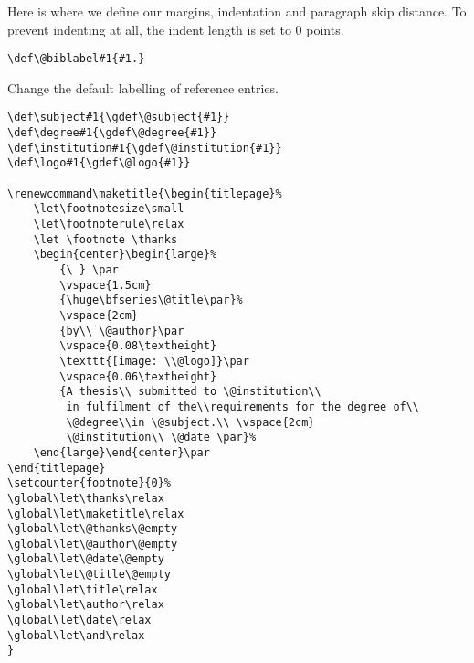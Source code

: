 \normalsize\doublespacing
Here is where we define our margins, indentation and paragraph skip distance.  To prevent indenting at all, the indent length is set to 0 points.

\small\singlespacing
\begin{verbatim}
\def\@biblabel#1{#1.}
\end{verbatim}

\normalsize\doublespacing
Change the default labelling of reference entries.

\small\singlespacing
\begin{verbatim}
\def\subject#1{\gdef\@subject{#1}}
\def\degree#1{\gdef\@degree{#1}}
\def\institution#1{\gdef\@institution{#1}}
\def\logo#1{\gdef\@logo{#1}}

\renewcommand\maketitle{\begin{titlepage}%
	\let\footnotesize\small
	\let\footnoterule\relax
	\let \footnote \thanks
	\begin{center}\begin{large}%
		{\ } \par
		\vspace{1.5cm}
		{\huge\bfseries\@title\par}%
		\vspace{2cm}
		{by\\ \@author}\par
		\vspace{0.08\textheight}
		\texttt{[image: \\@logo]}\par
		\vspace{0.06\textheight}
		{A thesis\\ submitted to \@institution\\
		 in fulfilment of the\\requirements for the degree of\\
		 \@degree\\in \@subject.\\ \vspace{2cm}
		 \@institution\\ \@date \par}%
	\end{large}\end{center}\par
\end{titlepage}
\setcounter{footnote}{0}%
\global\let\thanks\relax
\global\let\maketitle\relax
\global\let\@thanks\@empty
\global\let\@author\@empty
\global\let\@date\@empty
\global\let\@title\@empty
\global\let\title\relax
\global\let\author\relax
\global\let\date\relax
\global\let\and\relax
}
\end{verbatim}

